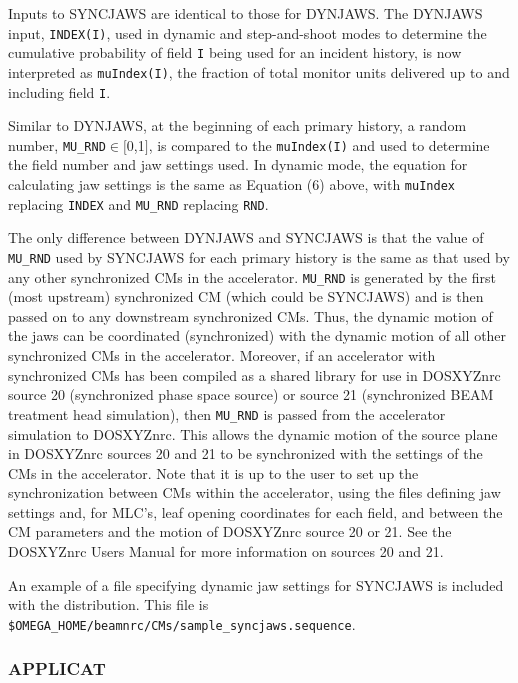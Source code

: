 \documentclass[12pt,twoside]{article}
\begin{document}
Inputs to SYNCJAWS are identical to those for DYNJAWS.  The DYNJAWS input, {\tt INDEX(I)}, used in dynamic
and step-and-shoot modes to determine the cumulative probability of field {\tt I} being used for
an incident history, is now interpreted as {\tt muIndex(I)}, the fraction of total monitor units
delivered up to and including field {\tt I}.

Similar to DYNJAWS, at the beginning of each primary history, a random number, {\tt MU\_RND}$\in[$0,1$]$, is
compared to the {\tt muIndex(I)} and used to determine the field number and jaw settings used.  In dynamic mode,
the equation for calculating jaw settings is the same as Equation (6) above, with {\tt muIndex} replacing
{\tt INDEX} and {\tt MU\_RND} replacing {\tt RND}.

The only difference between
DYNJAWS and SYNCJAWS is that the value of {\tt MU\_RND} used by SYNCJAWS for each primary history is the same as
that used by any other synchronized CMs in the accelerator.  {\tt MU\_RND} is generated by the first (most upstream) synchronized
CM (which could be SYNCJAWS) and is then passed on to any downstream synchronized CMs.
Thus, the dynamic motion of the jaws can be coordinated (synchronized) with the dynamic motion of all other synchronized CMs
in the accelerator.  Moreover, if an accelerator with synchronized CMs has been compiled as a shared library for use
in DOSXYZnrc source 20
(synchronized phase space source) or source 21 (synchronized BEAM treatment head simulation), then {\tt MU\_RND} is passed from the
accelerator simulation to DOSXYZnrc.  This allows the dynamic motion of the source plane in DOSXYZnrc sources 20 and 21 to be synchronized with
the settings of the CMs in the accelerator.
Note that it is up to the user to set up the synchronization between CMs within the accelerator, using the files defining jaw
settings and, for MLC's, leaf opening coordinates for each field, and between the CM parameters and the motion of
DOSXYZnrc source 20 or 21.
See the DOSXYZnrc Users Manual\cite{Wa05} for more information on sources 20 and 21.

An example of a file specifying dynamic jaw settings for SYNCJAWS
is included with the distribution.  This file is {\tt \$OMEGA\_HOME/beamnrc/CMs/sample\_syncjaws.sequence}.

\clearpage
\vspace*{-1cm}
\subsubsection{APPLICAT}
\renewcommand{\rightmark}{APPLICAT CM}
\end{document}
